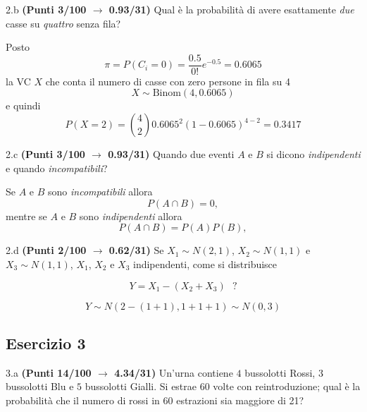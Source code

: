 \documentclass[
  11pt,
]{book}
\theoremstyle{mytheoremstyle}
\theoremstyle{mydefstyle}
\newenvironment{sol}
  {
  \begin{tcolorbox}[enhanced,breakable,arc=0.1mm,boxrule=1pt,colback=white,colframe=iblue,
  title=\bf \fontfamily{lmss}\selectfont \hspace{.5 cm} Soluzione,drop fuzzy shadow]

}{
\end{tcolorbox}
  }
\begin{document}
2.b \textbf{(Punti 3/100 \(\rightarrow\) 0.93/31)} Qual è la probabilità di avere esattamente \emph{due} casse su \emph{quattro} senza fila?

\begin{sol}
Posto
\[
\pi = P(C_i=0)=\frac {0.5}{0!}e^{-0.5}=0.6065
\]
la VC \(X\) che conta il numero di casse con zero persone in fila su 4
\[
X\sim\text{Binom}(4,0.6065)
\]
e quindi
\[
P(X=2)=\binom{4}{2}0.6065^2(1-0.6065)^{4-2}=0.3417
\]

\end{sol}

2.c \textbf{(Punti 3/100 \(\rightarrow\) 0.93/31)} Quando due eventi \(A\) e \(B\) si dicono \emph{indipendenti} e quando \emph{incompatibili}?

\begin{sol}
Se \(A\) e \(B\) sono \emph{incompatibili} allora
\[
P(A\cap B)=0,
\]
mentre se \(A\) e \(B\) sono \emph{indipendenti} allora
\[
P(A\cap B)=P(A)P(B),
\]

\end{sol}

2.d \textbf{(Punti 2/100 \(\rightarrow\) 0.62/31)} Se \(X_1\sim N(2,1)\), \(X_2\sim N(1,1)\) e \(X_3\sim N(1,1)\),
\(X_1\), \(X_2\) e \(X_3\) indipendenti, come si distribuisce

\[
  Y=X_1-(X_2+X_3) ~~~?
\]

\begin{sol}
\[Y\sim N(2-(1+1),1+1+1)\sim N(0,3)\]

\end{sol}

\subsection{Esercizio 3}\label{esercizio-3-3}

3.a \textbf{(Punti 14/100 \(\rightarrow\) 4.34/31)} Un'urna contiene \(4\) bussolotti Rossi, \(3\) bussolotti Blu e \(5\) bussolotti Gialli. Si estrae 60 volte con reintroduzione; qual è la probabilità che il numero di rossi in 60 estrazioni sia maggiore di 21?
\end{document}
